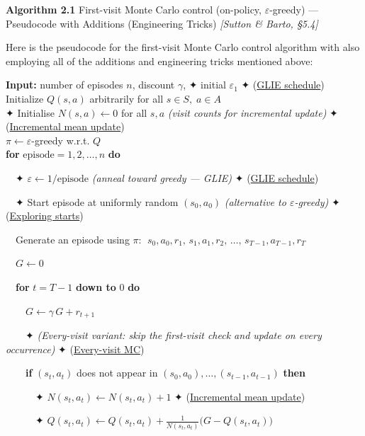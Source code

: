 \documentclass[11pt]{article}
\begin{document}
    \begin{pseudobox}

\textbf{Algorithm 2.1} First-visit Monte Carlo control (on-policy,
\(\varepsilon\)-greedy) --- Pseudocode with Additions (Engineering
Tricks) \emph{{[}Sutton \& Barto, §5.4{]}}

\tcbline

Here is the pseudocode for the first-visit Monte Carlo control algorithm
with also employing all of the additions and engineering tricks
mentioned above:

\textbf{Input:} number of episodes \(n\), discount \(\gamma\), ✦ initial
\(\varepsilon_1\) ✦ (\hyperref[trick-2-1-3]{GLIE schedule})\\
Initialize \(Q(s, a)\) arbitrarily for all \(s \in S,\; a \in A\)\\
✦ Initialise \(N(s,a) \leftarrow 0\) for all \(s, a\) \emph{(visit
counts for incremental update)} ✦ (\hyperref[trick-2-1-1]{Incremental
mean update})\\
\(\pi \leftarrow \varepsilon\)-greedy w.r.t. \(Q\)\\
\textbf{for} \(\text{episode} = 1, 2, \ldots, n\) \textbf{do}\\
\strut ~~✦ \(\varepsilon \leftarrow 1/\text{episode}\) \emph{(anneal
toward greedy --- GLIE)} ✦ (\hyperref[trick-2-1-3]{GLIE schedule})\\
\strut ~~✦ Start episode at uniformly random \((s_0, a_0)\)
\emph{(alternative to \(\varepsilon\)-greedy)} ✦
(\hyperref[trick-2-1-2]{Exploring starts})\\
\strut ~~Generate an episode using \(\pi\):
\(\;s_0, a_0, r_1,\, s_1, a_1, r_2,\, \ldots,\, s_{T-1}, a_{T-1}, r_T\)\\
\strut ~~\(G \leftarrow 0\)\\
\strut ~~\textbf{for} \(t = T - 1\) \textbf{down to} \(0\) \textbf{do}\\
\strut ~~~~\(G \leftarrow \gamma\, G + r_{t+1}\)\\
\strut ~~~~✦ \emph{(Every-visit variant: skip the first-visit check and
update on every occurrence)} ✦ (\hyperref[trick-2-1-4]{Every-visit
MC})\\
\strut ~~~~\textbf{if} \((s_t, a_t)\) does not appear in
\((s_0, a_0), \ldots, (s_{t-1}, a_{t-1})\) \textbf{then}\\
\strut ~~~~~~✦ \(N(s_t,a_t) \leftarrow N(s_t,a_t) + 1\) ✦
(\hyperref[trick-2-1-1]{Incremental mean update})\\
\strut ~~~~~~✦
\(Q(s_t,a_t) \leftarrow Q(s_t,a_t) + \frac{1}{N(s_t,a_t)}\bigl(G - Q(s_t,a_t)\bigr)\)

\end{pseudobox}
\end{document}
